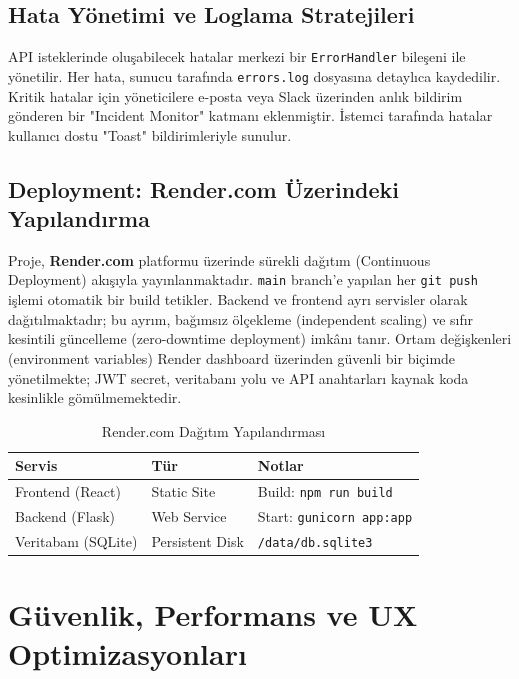 \documentclass[12pt,a4paper]{article}
\begin{document}
\subsection{Hata Yönetimi ve Loglama Stratejileri}
API isteklerinde oluşabilecek hatalar merkezi bir \texttt{ErrorHandler} bileşeni ile yönetilir. Her hata, sunucu tarafında \texttt{errors.log} dosyasına detaylıca kaydedilir. Kritik hatalar için yöneticilere e-posta veya Slack üzerinden anlık bildirim gönderen bir "Incident Monitor" katmanı eklenmiştir. İstemci tarafında hatalar kullanıcı dostu "Toast" bildirimleriyle sunulur.

\subsection{Deployment: Render.com Üzerindeki Yapılandırma}
Proje, \textbf{Render.com} platformu üzerinde sürekli dağıtım (Continuous Deployment) akışıyla yayınlanmaktadır. \texttt{main} branch'e yapılan her \texttt{git push} işlemi otomatik bir build tetikler. Backend ve frontend ayrı servisler olarak dağıtılmaktadır; bu ayrım, bağımsız ölçekleme (independent scaling) ve sıfır kesintili güncelleme (zero-downtime deployment) imkânı tanır. Ortam değişkenleri (environment variables) Render dashboard üzerinden güvenli bir biçimde yönetilmekte; JWT secret, veritabanı yolu ve API anahtarları kaynak koda kesinlikle gömülmemektedir.

\begin{table}[h!]
  \centering\small
  \begin{tabular}{@{} P{3.5cm} P{4cm} P{6cm} @{}}
    \toprule
    \textbf{Servis} & \textbf{Tür} & \textbf{Notlar} \\
    \midrule
    Frontend (React) & Static Site & Build: \texttt{npm run build} \\
    Backend (Flask) & Web Service & Start: \texttt{gunicorn app:app} \\
    Veritabanı (SQLite) & Persistent Disk & \texttt{/data/db.sqlite3} \\
    \bottomrule
  \end{tabular}
  \caption{Render.com Dağıtım Yapılandırması}
\end{table}

\section{Güvenlik, Performans ve UX Optimizasyonları}
\end{document}
